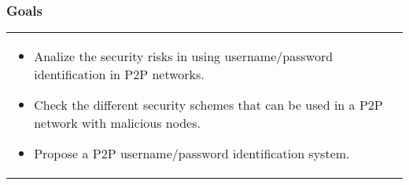 \begin{frame}
\frametitle{Goals}
\begin{table}
\begin{tabular}{p{7cm}p{3cm}}
\begin{itemize}
  \item Analize the security risks in using username/password identification in P2P networks. 
  \item Check the different security schemes that can be used in a P2P network with malicious nodes.
  \item Propose a P2P username/password identification system.
\end{itemize}
&
\vspace{1.5cm}
\end{tabular}
\end{table}
\end{frame}
